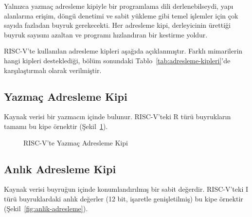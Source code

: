 Yalnızca yazmaç adresleme kipiyle bir programlama dili derlenebilseydi, yapı alanlarına erişim, döngü denetimi ve sabit yükleme gibi temel işlemler için çok sayıda fazladan buyruk gerekecekti. Her adresleme kipi, derleyicinin ürettiği buyruk sayısını azaltan ve programı hızlandıran bir kestirme yoldur.

RISC-V'te kullanılan adresleme kipleri aşağıda açıklanmıştır. Farklı mimarilerin hangi kipleri desteklediği, bölüm sonundaki Tablo~\ref{tab:adresleme-kipleri}'de karşılaştırmalı olarak verilmiştir.

\subsection{Yazmaç Adresleme Kipi}
Kaynak verisi bir yazmacın içinde bulunur. RISC-V'teki R türü buyrukların tamamı bu kipe örnektir (Şekil~\ref{fig:yazmac-adresleme}).

\begin{figure}[H]
\centering
{}
\caption{RISC-V'te Yazmaç Adresleme Kipi}
\label{fig:yazmac-adresleme}
\end{figure}

\subsection{Anlık Adresleme Kipi}
Kaynak verisi buyruğun içinde konumlandırılmış bir sabit değerdir. RISC-V'teki I türü buyruklardaki anlık değerler (12 bit, işaretle genişletilmiş) bu kipe örnektir (Şekil~\ref{fig:anlik-adresleme}).

